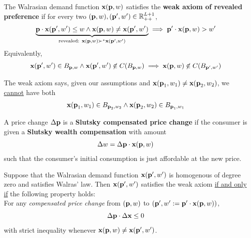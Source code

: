 \documentclass{report}
\begin{document}
 			\begin{definition}[2.F.1]
 				The Walrasian demand function $\textbf{x}(\textbf{p}, w)$ satisfies the \textbf{weak axiom of revealed preference} if for every two $(\textbf{p}, w), (\textbf{p}', w') \in \mathbb{R}_{++}^{L+1}$,
 				\begin{gather}
 					\underbrace{\textbf{p} \cdot \textbf{x}(\textbf{p}', w') \leq w
 					\land \textbf{x}(\textbf{p}, w) \neq \textbf{x}(\textbf{p}', w')}_{\text{{revealed: }} \textbf{x}(\textbf{p}, w) \succ^* \textbf{x}(\textbf{p}', w')}
 					\implies \textbf{p}' \cdot \textbf{x}(\textbf{p}, w) > w'
 				\end{gather}
 				Equivalently,
 				\begin{equation}
 					\vex(\vep', w') \in B_{\vep, w} \land \vex(\vep', w') \centernot \in C(B_{\vep, w}) \implies \vex(\vep, w) \centernot \in C(B_{\vep', w'})
 				\end{equation}
 			\end{definition}
 			
 			\begin{corollary}
 				The weak axiom says, given our assumptions and $\textbf{x}(\textbf{p}_1, w_1) \neq \textbf{x}(\textbf{p}_2, w_2)$, we \ul{cannot} have both 
 				\begin{equation}
 					\textbf{x}(\textbf{p}_1, w_1) \in B_{\textbf{p}_2, w_2} \land \textbf{x}(\textbf{p}_2, w_2) \in B_{\textbf{p}_1, w_1}
 				\end{equation}
 			\end{corollary}
 			
 			\begin{definition}
 				A price change $\Delta \textbf{p}$ is a \textbf{Slutsky compensated price change} if the consumer is given a \textbf{Slutsky wealth compensation} with amount
 				\begin{equation}
 					\Delta w = \Delta \textbf{p} \cdot \textbf{x}(\textbf{p}, w)
 				\end{equation}
 				such that the consumer's initial consumption is just affordable at the new price.
 			\end{definition}
 			
 			\begin{proposition}[2.F.1]
 				Suppose that the Walrasian demand function $\textbf{x}(\textbf{p}', w')$ is homogenous of degree zero and satisfies Walras' law. Then $\textbf{x}(\textbf{p}', w')$ satisfies the weak axiom \ul{if and only if} the following property holds: \\
 				For any \emph{compensated price change} from $(\textbf{p}, w)$ to $(\textbf{p}', w' := \textbf{p}' \cdot \textbf{x}(\textbf{p}, w))$,
 				\begin{equation}
 					\Delta \textbf{p} \cdot \Delta \textbf{x} \leq 0
 				\end{equation}
 				with strict inequality whenever $\textbf{x}(\textbf{p}, w) \neq \textbf{x}(\textbf{p}', w')$.
 			\end{proposition}
 			
\end{document}
